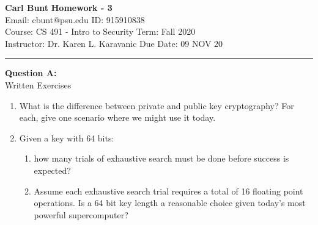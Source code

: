 \documentclass[a4paper, 11pt]{article}
\newenvironment{problem}[2][Question]
               { \begin{mdframed}[backgroundcolor=gray!20] \textbf{#1 #2:} \\}
               {   \end{mdframed}}
\begin{document}
 \noindent
 \large\textbf{Carl Bunt} \hfill \textbf{Homework - 3}   \\
 Email: cbunt@psu.edu \hfill ID: 915910838 \\
 \normalsize Course: CS 491 - Intro to Security \hfill Term: Fall 2020\\
 Instructor: Dr. Karen L. Karavanic \hfill Due Date: 09 NOV 20\\
 \noindent\rule{7in}{2.8pt}

 \begin{problem}{A}
   Written Exercises \\
   \begin{enumerate}[label=\arabic*.]
   \item
     What is the difference between private and public key cryptography? For each, give one scenario where we might use it today.
     
   \item
     Given a key with 64 bits:
     \begin{enumerate}[label=\alph*.]  
     \item
       how many trials of exhaustive search must be done before success is expected?
     \item
       Assume each exhaustive search trial requires a total of 16 floating point operations. Is a 64 bit key length a reasonable choice given today's most powerful supercomputer?
     \end{enumerate}
   \end{enumerate}
 \end{problem}
\end{document}
